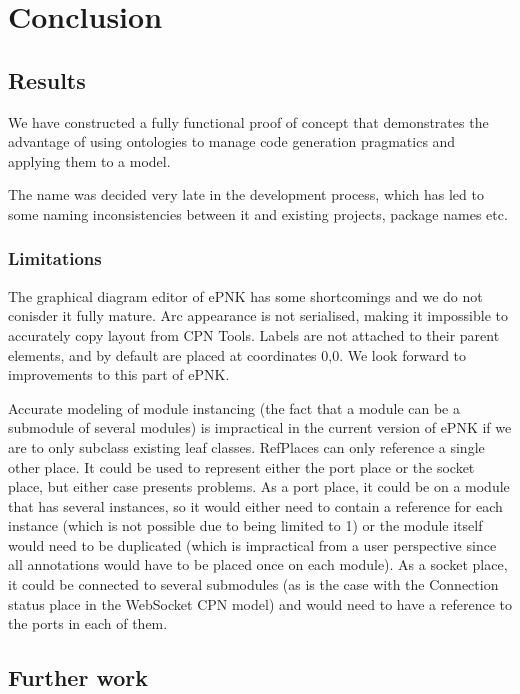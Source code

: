 \chapter{Conclusion}
\label{chap:conclusion}


\section{Results}

We have constructed a fully functional proof of concept that demonstrates the
advantage of using ontologies to manage code generation pragmatics and applying
them to a model.

The name \thename{} was decided very late in the development process, which has
led to some naming inconsistencies between it and existing projects, package
names etc.

\subsection{Limitations}

The graphical diagram editor of ePNK has some shortcomings and we do not
conisder it fully mature. Arc appearance is not serialised, making it impossible
to accurately copy layout from CPN Tools. Labels are not attached to their
parent elements, and by default are placed at coordinates 0,0. We look forward
to improvements to this part of ePNK.

Accurate modeling of module instancing (the fact that a module can be a
submodule of several modules) is impractical in the current version of ePNK if
we are to only subclass existing leaf classes.
RefPlaces can only reference a single other place. It could be used to represent
either the port place or the socket place, but either case presents problems. As
a port place, it could be on a module that has several instances, so it would
either need to contain a reference for each instance (which is not possible due
to being limited to 1) or the module itself would need to be duplicated (which
is impractical from a user perspective since all annotations would have to be
placed once on each module). As a socket place, it could be connected to several
submodules (as is the case with the Connection status place in the WebSocket
CPN model) and would need to have a reference to the ports in each of them. 

\section{Further work}

